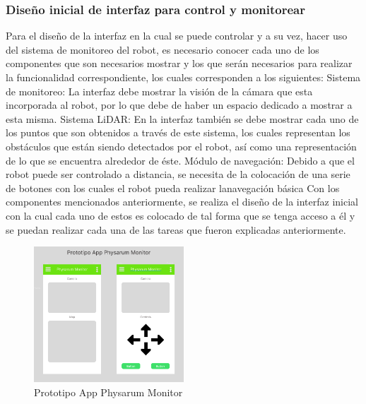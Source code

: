\subsubsection{Dise\~no inicial de interfaz para control y monitorear}
    Para el dise\~no de la interfaz en la cual se puede controlar y a
        su vez, hacer uso del sistema de monitoreo del robot, es
        necesario conocer cada uno de los componentes que son
        necesarios mostrar y los que ser\'an necesarios para realizar la
        funcionalidad correspondiente, los cuales corresponden a los
        siguientes:
    \vskip 0.5cm
    Sistema de monitoreo: La interfaz debe mostrar la visi\'on de
        la c\'amara que esta incorporada al robot, por lo que debe de
        haber un espacio dedicado a mostrar a esta misma.
        \vskip 0.5cm
    Sistema LiDAR: En la interfaz tambi\'en se debe mostrar cada
        uno de los puntos que son obtenidos a trav\'es de este sistema,
        los cuales representan los obst\'aculos que est\'an siendo
        detectados por el robot, as\'i como una representaci\'on de lo
        que se encuentra alrededor de \'este.
        \vskip 0.5cm
    M\'odulo de navegaci\'on: Debido a que el robot puede ser
        controlado a distancia, se necesita de la colocaci\'on de una
        serie de botones con los cuales el robot pueda realizar lanavegaci\'on b\'asica
        Con los componentes mencionados anteriormente, se realiza
        el dise\~no de la interfaz inicial con la cual cada uno de estos
        es colocado de tal forma que se tenga acceso a \'el y se
        puedan realizar cada una de las tareas que fueron explicadas
        anteriormente.
    \vskip 0.5cm
    \begin{figure}[htbp]
        \centering
        \includegraphics[width=0.5\textwidth]{./images/Pruebas/simulador/image077.png}
        \caption{Prototipo App Physarum Monitor}
        \label{fig:77}
    \end{figure}
